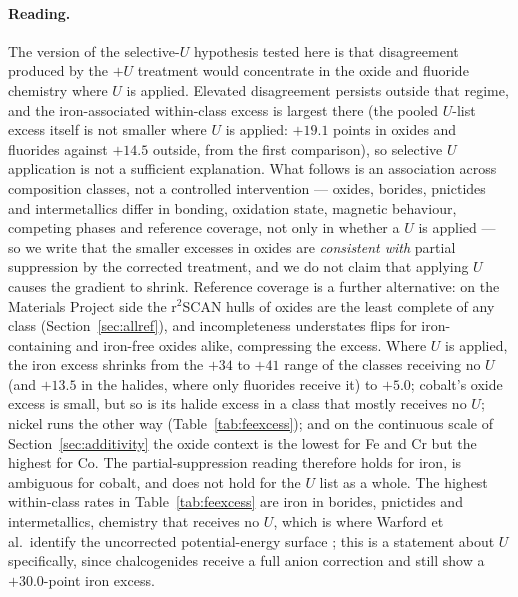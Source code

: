 \documentclass[11pt]{article}
\begin{document}
\paragraph{Reading.} The version of the selective-$U$ hypothesis tested here is that
disagreement produced by the $+U$ treatment would concentrate in the oxide and fluoride
chemistry where $U$ is applied. Elevated disagreement persists outside that regime, and
the iron-associated within-class excess is largest there (the pooled $U$-list excess
itself is not smaller where $U$ is applied: $+19.1$ points in oxides and fluorides
against $+14.5$ outside, from the first comparison), so
selective $U$ application is not a sufficient explanation. What
follows is an association across composition classes, not a controlled intervention ---
oxides, borides, pnictides and intermetallics differ in bonding, oxidation state,
magnetic behaviour, competing phases and reference coverage, not only in whether a $U$
is applied --- so we write that the smaller excesses in oxides are \emph{consistent with}
partial suppression by the corrected treatment, and we do not claim that applying $U$
causes the gradient to shrink. Reference coverage is a further alternative: on the
Materials Project side the r$^2$SCAN hulls of oxides are the least complete of any class
(Section~\ref{sec:allref}), and incompleteness understates flips for iron-containing and
iron-free oxides alike, compressing the excess. Where $U$ is applied, the iron excess shrinks from the $+34$ to $+41$ range of the
classes receiving no $U$ (and $+13.5$ in the halides, where only fluorides receive it) to $+5.0$; cobalt's oxide excess is small, but so is its halide excess in a
class that mostly receives no $U$; nickel runs the other way (Table~\ref{tab:feexcess}); and on
the continuous scale of Section~\ref{sec:additivity} the oxide context is the lowest for
Fe and Cr but the highest for Co. The partial-suppression reading therefore holds for
iron, is ambiguous for cobalt, and does not hold for the $U$ list as a whole. The highest within-class rates in
Table~\ref{tab:feexcess} are iron in borides, pnictides and intermetallics, chemistry that receives no $U$, which is where Warford et al.\ identify the
uncorrected potential-energy surface \citep{warford2026}; this is a statement about $U$
specifically, since chalcogenides receive a full anion correction and still show a
$+30.0$-point iron excess.
\end{document}
